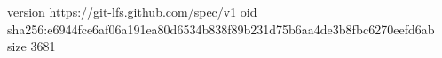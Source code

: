 version https://git-lfs.github.com/spec/v1
oid sha256:e6944fce6af06a191ea80d6534b838f89b231d75b6aa4de3b8fbc6270eefd6ab
size 3681
